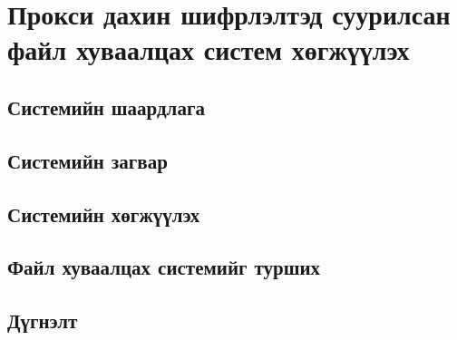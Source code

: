 
\chapter{Прокси дахин шифрлэлтэд суурилсан файл хуваалцах систем хөгжүүлэх} %
\label{Chapter3} %
\pagecolor{white}

\section{Системийн шаардлага}

\section{Системийн загвар}

\section{Системийн хөгжүүлэх}

\section{Файл хуваалцах системийг турших}

\section{Дүгнэлт}

